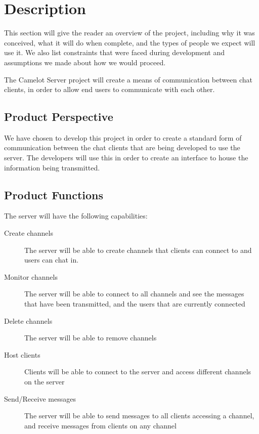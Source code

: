\chapter{Description}\label{description}
This section will give the reader an overview of the project, including
why it was conceived, what it will do when complete, and the types of
people we expect will use it. We also list constraints that were faced
during development and assumptions we made about how we would proceed.

The Camelot Server project will create a means of communication between
chat clients, in order to allow end users to communicate with each
other.

\section{Product Perspective}\label{product-perspective}
We have chosen to develop this project in order to create a standard
form of communication between the chat clients that are being developed
to use the server. The developers will use this in order to create an
interface to house the information being transmitted.

\section{Product Functions}\label{product-functions}
The server will have the following capabilities:

\begin{description}
    \item[Create channels] The server will be able to create channels that clients can
        connect to and users can chat in.

    \item[Monitor channels] The server will be able to connect to all channels and see the messages
        that have been transmitted, and the users that are currently connected

    \item[Delete channels] The server will be able to remove channels

    \item[Host clients] Clients will be able to connect to the server and access different
        channels on the server

    \item[Send/Receive messages] The server will be able to send messages to all clients accessing a
        channel, and receive messages from clients on any channel

\end{description}



